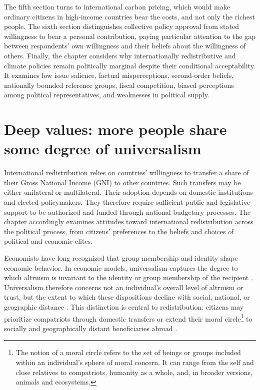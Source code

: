 \documentclass[11pt,a4paper]{article}
\begin{document}
The fifth section turns to international carbon pricing, %
which would make ordinary citizens in high-income countries bear the costs, and not only the richest people. %
The sixth section distinguishes collective policy approval from stated willingness to bear a personal contribution, paying particular attention to the gap between respondents' own willingness and their beliefs about the willingness of others. %
Finally, the chapter considers why internationally redistributive and climate policies remain politically marginal despite their conditional acceptability. It examines low issue salience, factual misperceptions, second-order beliefs, nationally bounded reference groups, %
fiscal competition, biased perceptions among political representatives, and weaknesses in political supply.

\section{Deep values: more people share some degree of universalism} %

International redistribution relies on countries' %
willingness to transfer a share of their Gross National Income (GNI) to other countries. Such transfers may be either unilateral or multilateral. Their adoption depends on domestic institutions and elected policymakers. They therefore require sufficient public and legislative support to be authorized and funded through national budgetary processes. The chapter accordingly examines attitudes toward international redistribution across the political process, from citizens' preferences to the beliefs and choices of political and economic elites.

Economists have long recognized that group membership and identity shape economic behavior. In economic models, universalism captures the degree to which altruism is invariant to the identity or group membership of the recipient \citep{Tabellini_2008}. Universalism therefore concerns not an individual's overall level of altruism or trust, but the extent to which these dispositions decline with social, national, or geographic distance \citep{cappelen_universalism_2025,enke_moral_2023}. This distinction is central to redistribution: citizens may prioritize compatriots through domestic transfers or extend their moral circle\footnote{The notion of a moral circle refers to the set of beings or groups included within an individual's sphere of moral concern. It can range from the self and close relatives to compatriots, humanity as a whole, and, in broader versions, animals and ecosystems.} to socially and geographically distant beneficiaries abroad \citep{cappelen_universalism_2025,enke_moral_2023}.
\end{document}
